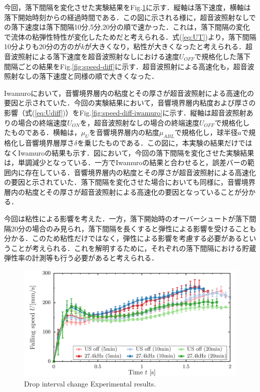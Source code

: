 今回，落下間隔を変化させた実験結果をFig.\ref{fig:interval-change}に示す．縦軸は落下速度，横軸は落下開始時刻からの経過時間である．この図に示される様に，超音波照射なしでの落下速度は落下間隔10分,5分,20分の順で速かった．これは，落下間隔の変化で流体の粘弾性特性が変化したためだと考えられる．式(\ref{eq:UT})より，落下間隔10分よりも20分の方のが$k$が大きくなり，粘性が大きくなったと考えられる．超音波照射による落下速度を超音波照射なしにおける速度$U_{OFF}$で規格化した落下間隔ごとの結果をFig.\ref{fig:speed-diff}に示す．超音波照射による高速化も，超音波照射なしの落下速度と同様の順で大きくなった．

Iwamuro\cite{ref:8}において，音響境界層内の粘度とその厚さが超音波照射による高速化の要因と示されていた．今回の実験結果において，音響境界層内粘度および厚さの影響（式(\ref{eq:Udiff})）をFig.\ref{fig:speed-diff-iwamuro}に示す．縦軸は超音波照射ありの場合の終端速度$U_{ON}$を，超音波照射なしの場合の終端速度$U_{OFF}$で規格化したものである．横軸は，$\mu_U$を音響境界層内の粘度$\mu_{ABL}$で規格化し，球半径$a$で規格化し音響境界層厚さ$\delta$を乗じたものである．この図に，本実験の結果だけではなくIwamuro\cite{ref:8}の結果も示す．図において，今回の落下間隔を変化させた実験結果は，単調減少となっている．一方でIwamuro\cite{ref:8}の結果と合わせると，誤差バーの範囲内に存在している．音響境界層内の粘度とその厚さが超音波照射による高速化の要因と示されていた．落下間隔を変化させた場合においても同様に，音響境界層内の粘度とその厚さが超音波照射による高速化の要因となっていることが分かる．

今回は粘性による影響を考えた．一方，落下開始時のオーバーシュートが落下間隔20分の場合のみ見られ，落下間隔を長くすると弾性による影響を受けることも分かる．このため粘性だけではなく，弾性による影響を考慮する必要があるということが考えられる．これを解明するために，それぞれの落下間隔における貯蔵弾性率の計測等も行う必要があると考えられる．

\begin{figure}[ht]
    \begin{center}
        \includegraphics[width=13cm,clip]{5-Discussion/interval.png}
        \caption{Drop interval change Experimental results.}
        \label{fig:interval-change}
    \end{center}
\end{figure}

